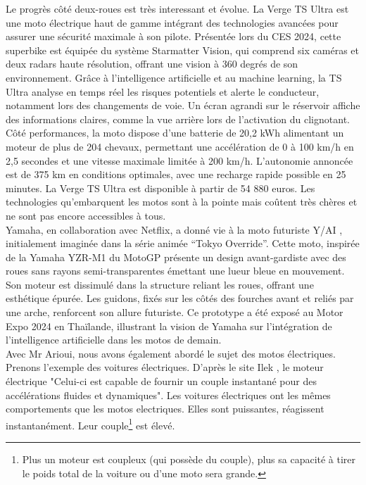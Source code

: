 Le progrès côté deux-roues est très interessant et évolue.
La Verge TS Ultra est une moto électrique \cite{lenoir_cette_2024} haut de gamme intégrant des technologies avancées pour assurer une sécurité maximale à son pilote. Présentée lors du CES 2024, cette superbike est équipée du système Starmatter Vision, qui comprend six caméras et deux radars haute résolution, offrant une vision à 360 degrés de son environnement. Grâce à l’intelligence artificielle et au machine learning, la TS Ultra analyse en temps réel les risques potentiels et alerte le conducteur, notamment lors des changements de voie. Un écran agrandi sur le réservoir affiche des informations claires, comme la vue arrière lors de l’activation du clignotant. Côté performances, la moto dispose d’une batterie de 20,2 kWh alimentant un moteur de plus de 204 chevaux, permettant une accélération de 0 à 100 km/h en 2,5 secondes et une vitesse maximale limitée à 200 km/h. L’autonomie annoncée est de 375 km en conditions optimales, avec une recharge rapide possible en 25 minutes. La Verge TS Ultra est disponible à partir de 54 880 euros.
Les technologies qu'embarquent les motos sont à la pointe mais coûtent très chères et ne sont pas encore accessibles à tous.
\\
Yamaha, en collaboration avec Netflix, a donné vie à la moto futuriste Y/AI \cite{texier_quand_2024} , initialement imaginée dans la série animée “Tokyo Override”. Cette moto, inspirée de la Yamaha YZR-M1 du MotoGP présente un design avant-gardiste avec des roues sans rayons semi-transparentes émettant une lueur bleue en mouvement. Son moteur est dissimulé dans la structure reliant les roues, offrant une esthétique épurée. Les guidons, fixés sur les côtés des fourches avant et reliés par une arche, renforcent son allure futuriste. Ce prototype a été exposé au Motor Expo 2024 en Thaïlande, illustrant la vision de Yamaha sur l’intégration de l’intelligence artificielle dans les motos de demain.
\\
Avec Mr Arioui, nous avons également abordé le sujet des motos électriques. Prenons l'exemple des voitures électriques.
D'après le site Ilek \cite{voiture_electrique}, le moteur électrique "Celui-ci est capable de fournir un couple instantané pour des accélérations fluides et dynamiques". Les voitures électriques ont les mêmes comportements que les motos electriques. Elles sont puissantes, réagissent instantanément. Leur couple\footnote{Plus un moteur est coupleux (qui possède du couple), plus sa capacité à tirer le poids total de la voiture ou d'une moto sera grande.} est élevé.

